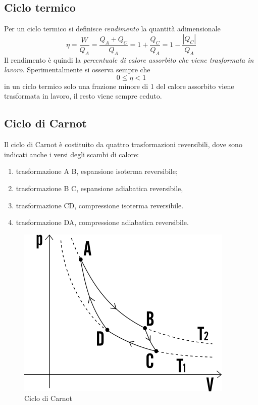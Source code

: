 \documentclass[class=book, crop=false, oneside, 12pt]{standalone}
\begin{document}
\subsection{Ciclo termico}

Per un ciclo termico si definisce \emph{rendimento} la quantità adimensionale 
\begin{equation}
    \eta = \frac{W}{Q_A} = \frac{Q_A + Q_C}{Q_A} = 1+ \frac{Q_C}{Q_A} = 1 - \frac{|Q_C|}{Q_A}
\end{equation}
Il rendimento è quindi la \emph{percentuale di calore assorbito che viene trasformata in lavoro}.
Sperimentalmente si osserva sempre che
\begin{equation*}
    0 \leq \eta < 1
\end{equation*}
in un ciclo termico solo una frazione minore di 1 del calore assorbito viene trasformata in lavoro, il resto viene sempre ceduto.

\subsection{Ciclo di Carnot}

Il ciclo di Carnot è costituito da quattro trasformazioni reversibili, dove sono indicati anche i versi degli scambi di calore: 

\begin{enumerate}
    \item trasformazione A B, espansione isoterma reversibile;
    \item trasformazione B C, espansione adiabatica reversibile,
    \item trasformazione CD, compressione isoterma reversibile.
    \item trasformazione DA, compressione adiabatica reversibile.
\end{enumerate}

\begin{figure}[h]
    \includegraphics[scale=0.4]{ciclo-di-carnot}
    \centering
    \caption{Ciclo di Carnot}
\end{figure}
\end{document}
